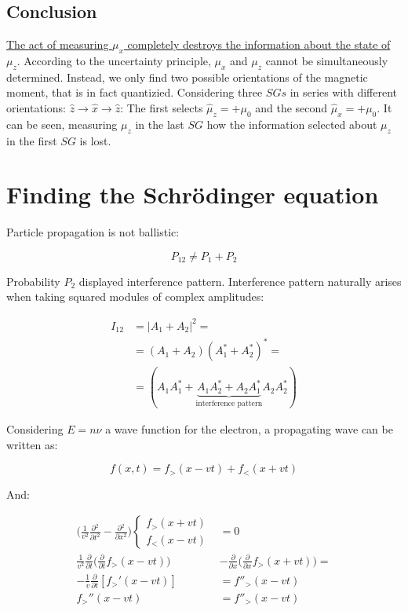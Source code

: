   \subsection{Conclusion}
  \underline{The act of measuring $\mu_x$ completely destroys the information about the state of $\mu_z$}.
  According to the uncertainty principle, $\mu_x$ and $\mu_z$ cannot be simultaneously determined.
  Instead, we only find two possible orientations of the magnetic moment, that is in fact quantizied.
  Considering three $SGs$ in series with different orientations: $\hat{z}\rightarrow\hat{x}\rightarrow\hat{z}$:
  The first selects $\hat{\mu}_z = +\mu_0$ and the second $\hat{\mu}_x = +\mu_0$.
  It can be seen, measuring $\mu_z$ in the last $SG$ how the information selected about $\mu_z$ in the first $SG$ is lost.

\section{Finding the Schr\"odinger equation}
Particle propagation is not ballistic:

$$P_{12} \neq P_1 + P_2$$

Probability $P_2$ displayed interference pattern.
Interference pattern naturally arises when taking squared modules of complex amplitudes:

\begin{align*}
  I_{12} &= |A_1 + A_2|^2=\\
         &=(A_1 + A_2)(A_1^*+A_2^*)^*=\\
         &=(A_1A_1^*+\underbrace{A_1A_2^*+A_2A_1^*}_{\text{interference pattern}}A_2A_2^*)
\end{align*}

Considering $E=n\nu$ a wave function for the electron, a propagating wave can be written as:

$$f(x,t) = f_>(x-vt)+f_<(x+vt)$$

And:

\begin{align*}
  \biggl(\frac{1}{v^2}\frac{\partial {^2}}{\partial {t^2}}-\frac{\partial {^2}}{\partial {x^2}}\biggr)\begin{cases}f_>(x+vt)\\f_<(x-vt)\end{cases} &= 0\\
  \frac{1}{v^2}\frac{\partial {}}{\partial {t}}\biggl(\frac{\partial {}}{\partial {t}}f_>(x-vt)\biggr)&-\frac{\partial {}}{\partial {x}}\biggl(\frac{\partial {}}{\partial {x}}f_>(x+vt)\biggr)=\\
  -\frac{1}{v}\frac{\partial {}}{\partial {t}}[f_>'(x-vt)]&=f''_>(x-vt)\\
  f_>''(x-vt) &=f''_>(x-vt)
\end{align*}

